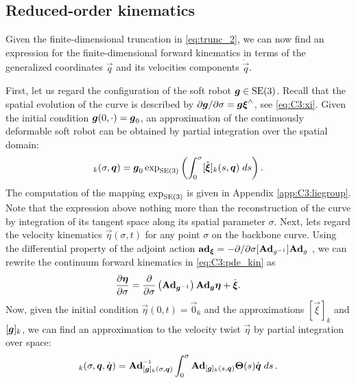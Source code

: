 
\subsection{Reduced-order kinematics}
Given the finite-dimensional truncation in \eqref{eq:trunc_2}, we can now find an expression for the finite-dimensional forward kinematics in terms of the generalized coordinates $\vec{q}$ and its velocities components $\dot{\vec{q}}$.

First, let us regard the configuration of the soft robot $\boldsymbol{g} \in \textup{\textrm{SE}}(3)$. Recall that the spatial evolution of the curve is described by $\partial \boldsymbol{g}/\partial\sigma = \boldsymbol{g} \boldsymbol{\xi}^\wedge$, see \eqref{eq:C3:xi}. Given the initial condition $\boldsymbol{g}(0,\cdot) = \boldsymbol{g}_0$, an approximation of the continuously deformable soft robot can be obtained by partial integration over the spatial domain:
%
\vspace{-2mm}
\begin{equation}
[\mat{g}]_k(\sigma,\vec{q}) = \mat{g}_0 \exp_{\SE{3}}\left(\int_0^\sigma [\hat{\vec{\xi}}]_k(s,\vec{q}) \; ds \right).
\end{equation}
%
The computation of the mapping $\exp_{\textup{\textrm{SE}}(3)}$ is given in Appendix \ref{app:C3:liegroup}. Note that the expression above nothing more than the reconstruction of the curve by integration of its tangent space along its spatial parameter $\sigma$. Next, lets regard the velocity kinematics $\vec{\eta}(\sigma,t)$ for any point $\sigma$ on the backbone curve. Using the differential property of the adjoint action $\boldsymbol{\textbf{ad}}_{\boldsymbol{\xi}} = -\partial /\partial \sigma [\textbf{Ad}_{g^{-1}}] \textbf{Ad}_{g}$ \cite{Murray1994}, we can rewrite the
continuum forward kinematics in \eqref{eq:C3:pde_kin} as
%
\begin{equation}
\frac{\partial \boldsymbol{\eta}}{\partial \sigma } = \frac{\partial }{\partial \sigma }\left(\boldsymbol{\textbf{Ad}}_{\boldsymbol{g}^{-1}}\right) \boldsymbol{\textbf{Ad}}_{\boldsymbol{g}} \boldsymbol{\eta} + \dot{\boldsymbol{\xi}}. \label{eq:eta_adg}
\end{equation}
%
Now, given the initial condition $\vec{\eta}(0,t) = \vec{0}_6$ and the approximations $[\vec{\xi}]_k$ and $[\boldsymbol{g}]_k$, we can find an approximation to the velocity twist $\vec{\eta}$ by partial integration over space:
%
\begin{equation}
[\vec{\eta}]_k(\sigma,\vec{q},\dot{\vec{q}}) = \Ad_{[\mat{g}]_k(\sigma,\q)}\inv \int_0^\sigma \Ad_{[\mat{g}]_k(s,\q)} \mat{\Theta}(s) \dot{\vec{q}} \; ds \,. \label{eq:C3:eta_analytic}
\end{equation}
